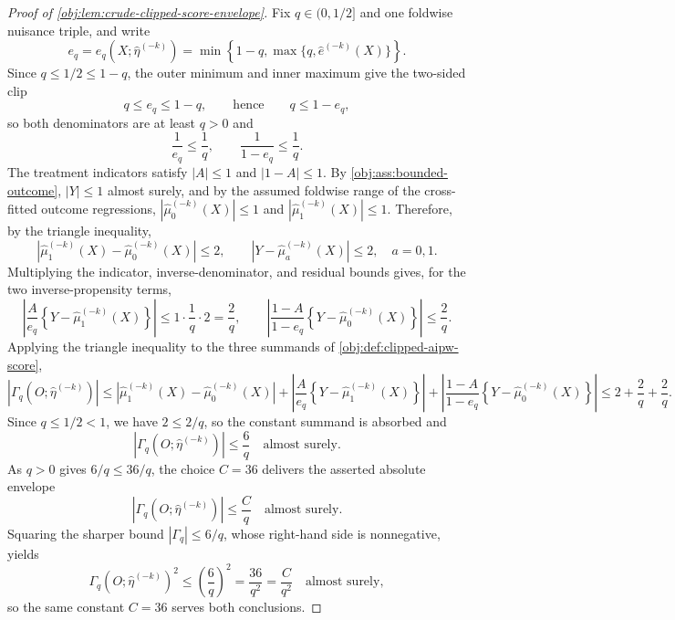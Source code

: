 \begin{proof}[Proof of \cref{obj:lem:crude-clipped-score-envelope}]
Fix \(q\in(0,1/2]\) and one foldwise nuisance triple, and write
\[
e_q=e_q\!\left(X;\widehat\eta^{(-k)}\right)
=\min\left\{1-q,\max\{q,\widehat e^{(-k)}(X)\}\right\}.
\]
Since \(q\le1/2\le 1-q\), the outer minimum and inner maximum give the two-sided clip
\[
q\le e_q\le 1-q,
\qquad\text{hence}\qquad
q\le 1-e_q,
\]
so both denominators are at least \(q>0\) and
\[
\frac1{e_q}\le\frac1q,
\qquad
\frac1{1-e_q}\le\frac1q .
\]
The treatment indicators satisfy \(|A|\le1\) and \(|1-A|\le1\).  By \cref{obj:ass:bounded-outcome}, \(|Y|\le1\) almost surely, and by the assumed foldwise range of the cross-fitted outcome regressions, \(|\widehat\mu_0^{(-k)}(X)|\le1\) and \(|\widehat\mu_1^{(-k)}(X)|\le1\).  Therefore, by the triangle inequality,
\[
\left|\widehat\mu_1^{(-k)}(X)-\widehat\mu_0^{(-k)}(X)\right|\le2,\qquad
\left|Y-\widehat\mu_a^{(-k)}(X)\right|\le2,\quad a=0,1 .
\]
Multiplying the indicator, inverse-denominator, and residual bounds gives, for the two inverse-propensity terms,
\[
\left|\frac{A}{e_q}\left\{Y-\widehat\mu_1^{(-k)}(X)\right\}\right|\le 1\cdot\frac1q\cdot 2=\frac{2}{q},
\qquad
\left|\frac{1-A}{1-e_q}\left\{Y-\widehat\mu_0^{(-k)}(X)\right\}\right|\le \frac{2}{q}.
\]
Applying the triangle inequality to the three summands of \cref{obj:def:clipped-aipw-score},
\[
\left|\Gamma_q\!\left(O;\widehat\eta^{(-k)}\right)\right|
\le
\left|\widehat\mu_1^{(-k)}(X)-\widehat\mu_0^{(-k)}(X)\right|
+\left|\frac{A}{e_q}\left\{Y-\widehat\mu_1^{(-k)}(X)\right\}\right|
+\left|\frac{1-A}{1-e_q}\left\{Y-\widehat\mu_0^{(-k)}(X)\right\}\right|
\le 2+\frac{2}{q}+\frac{2}{q}.
\]
Since \(q\le1/2<1\), we have \(2\le 2/q\), so the constant summand is absorbed and
\[
\left|\Gamma_q\!\left(O;\widehat\eta^{(-k)}\right)\right|\le\frac{6}{q}
\quad\text{almost surely}.
\]
As \(q>0\) gives \(6/q\le 36/q\), the choice \(C=36\) delivers the asserted absolute envelope
\[
\left|\Gamma_q\!\left(O;\widehat\eta^{(-k)}\right)\right|\le\frac{C}{q}
\quad\text{almost surely}.
\]
Squaring the sharper bound \(|\Gamma_q|\le 6/q\), whose right-hand side is nonnegative, yields
\[
\Gamma_q\!\left(O;\widehat\eta^{(-k)}\right)^2\le \left(\frac{6}{q}\right)^2=\frac{36}{q^2}=\frac{C}{q^2}
\quad\text{almost surely},
\]
so the same constant \(C=36\) serves both conclusions. %
\end{proof}
